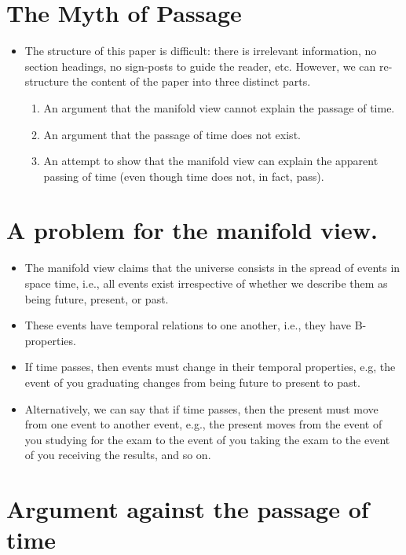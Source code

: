 \documentclass[oneside]{article}
\begin{document}
\thispagestyle{fancy}

\section{The Myth of Passage}

\begin{itemize}
\item The structure of this paper is difficult: there is irrelevant information, no section headings, no sign-posts to guide the reader, etc. However, we can re-structure the content of the paper into three distinct parts. 
\begin{enumerate}
\item An argument that the manifold view cannot explain the passage of time. 
\item An argument that the passage of time does not exist. 
\item An attempt to show that the manifold view can explain the apparent passing of time (even though time does not, in fact, pass). 
\end{enumerate}
\end{itemize}

\section{A problem for the manifold view.}

\begin{itemize}
\item The manifold view claims that the universe consists in the spread of events in space time, i.e., all events exist irrespective of whether we describe them as being future, present, or past.  
\item These events have temporal relations to one another, i.e., they have B-properties. 
\item If time passes, then events must change in their temporal properties, e.g, the event of you graduating changes from being future to present to past. 
\item Alternatively, we can say that if time passes, then the present must move from one event to another event, e.g., the present moves from the event of you studying for the exam to the event of you taking the exam to the event of you receiving the results, and so on. 
\end{itemize}

\section{Argument against the passage of time}
\end{document}
